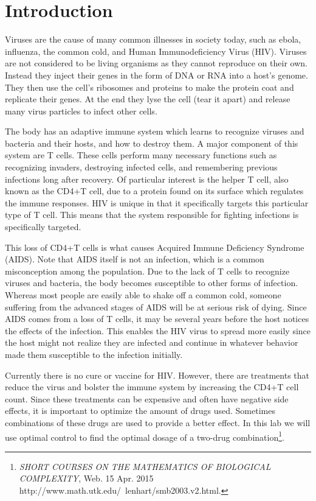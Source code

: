 \label{lab:hiv}


\section*{Introduction}
    Viruses are the cause of many common illnesses in society today, such as ebola, influenza, the common cold, and Human Immunodeficiency Virus (HIV).
Viruses are not considered to be living organisms as they cannot reproduce on their own.
Instead they inject their genes in the form of DNA or RNA into a host's genome.
They then use the cell's ribosomes and proteins to make the protein coat and replicate their genes.
At the end they lyse the cell (tear it apart) and release many virus particles to infect other cells.\par
    The body has an adaptive immune system which learns to recognize viruses and bacteria and their hosts, and how to destroy them.
A major component of this system are T cells.
These cells perform many necessary functions such as recognizing invaders, destroying infected cells, and remembering previous infections long after recovery.
Of particular interest is the helper T cell, also known as the CD4+T cell, due to a protein found on its surface which regulates the immune responses.
HIV is unique in that it specifically targets this particular type of T cell.
This means that the system responsible for fighting infections is specifically targeted.\par
    This loss of CD4+T cells is what causes Acquired Immune Deficiency Syndrome (AIDS).
Note that AIDS itself is not an infection, which is a common misconception among the population.
Due to the lack of T cells to recognize viruses and bacteria, the body becomes susceptible to other forms of infection.
Whereas most people are easily able to shake off a common cold, someone suffering from the advanced stages of AIDS will be at serious risk of dying.
Since AIDS comes from a loss of T cells, it may be several years before the host notices the effects of the infection.
This enables the HIV virus to spread more easily since the host might not realize they are infected and continue in whatever behavior made them susceptible to the infection initially.\par
   Currently there is no cure or vaccine for HIV.
However, there are treatments that reduce the virus and bolster the immune system by increasing the CD4+T cell count.
Since these treatments can be expensive and often have negative side effects, it is important to optimize the amount of drugs used.
Sometimes combinations of these drugs are used to provide a better effect.
In this lab we will use optimal control to find the optimal dosage of a two-drug combination\footnote{\textit{SHORT COURSES ON THE MATHEMATICS OF BIOLOGICAL COMPLEXITY}, Web. 15 Apr. 2015 http://www.math.utk.edu/~lenhart/smb2003.v2.html.}.
   
